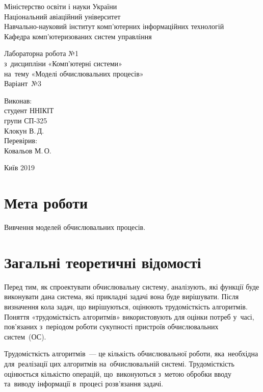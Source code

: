 \documentclass[
	a4paper,
	oneside,
	BCOR = 10mm,
	DIV = 12,
	12pt,
	headings = normal,
]{scrartcl}
\newcommand{\allcaps}[1]{{\addfontfeatures{LetterSpace = 8, Kerning = Off}#1}}
\begin{document}
\begin{titlepage}
		\begin{center}
			Міністерство освіти і науки України\\
			Національний авіаційний університет\\
			Навчально-науковий інститут комп'ютерних інформаційних технологій\\
			Кафедра комп'ютеризованих систем управління

			\vspace{\fill}
				Лабораторна робота №1\\
				з~дисципліни «Комп'ютерні системи»\\
				на~тему «Моделі обчислювальних процесів»\\
				Варіант~№3

			\vspace{\fill}

			\begin{flushright}
				Виконав:\\
				студент \allcaps{ННІКІТ}\\
				групи СП-325\\
				Клокун В.\,Д.\\
				Перевірив:\\
				Ковальов М.\,О.
			\end{flushright}

			Київ 2019
		\end{center}
	\end{titlepage}

	\section{Мета роботи}
		Вивчення моделей обчислювальних процесів.

	\section{Загальні теоретичні відомості}
		Перед тим, як спроектувати обчислювальну систему, аналізують, які функції буде виконувати дана система, які прикладні задачі вона буде вирішувати. Після визначення кола задач, що вирішуються, оцінюють трудомісткість алгоритмів. Поняття «трудомісткість алгоритмів» використовують для оцінки потреб у~часі, пов'\-я\-за\-них з~періодом роботи сукупності пристроїв обчислювальних систем~(ОС).

		Трудомісткість алгоритмів~— це кількість обчислювальної роботи, яка~необхідна для~реалізації цих алгоритмів на~обчислювальній системі. Трудомісткість оцінюється кількістю операцій, що~виконуються з~метою обробки вводу та~виводу інформації в~процесі роз\-в'я\-за\-ння задачі.
\end{document}
